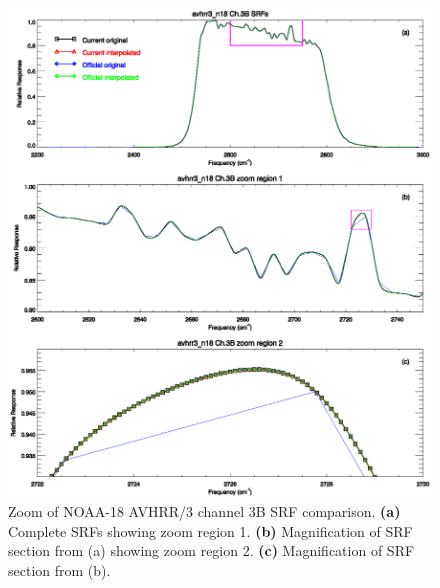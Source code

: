 \begin{figure}[htp]
  \centering
  \includegraphics[scale=1]{graphics/zoom/avhrr3_n18.ch3.srf.zoom.eps}
  \caption{Zoom of NOAA-18 AVHRR/3 channel 3B SRF comparison. \textbf{(a)} Complete SRFs showing zoom region 1. \textbf{(b)} Magnification of SRF section from (a) showing zoom region 2.  \textbf{(c)} Magnification of SRF section from (b).}
  \label{fig:avhrr3_n18.ch3.srf.zoom}
\end{figure}

